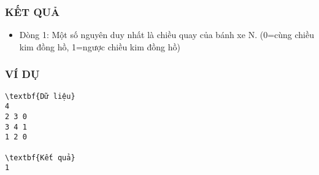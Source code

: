 \subsubsection{   KẾT QUẢ  }
\begin{itemize}
	\item     Dòng 1: Một số nguyên duy nhất là chiều quay của bánh xe N.         (0=cùng chiều kim đồng hồ, 1=ngược chiều kim đồng hồ)   
\end{itemize}

\subsubsection{   VÍ DỤ  }
\begin{verbatim}
\textbf{Dữ liệu}
4
2 3 0
3 4 1
1 2 0

\textbf{Kết quả}
1
\end{verbatim}